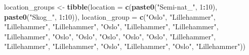\documentclass[]{article}
\newenvironment{Shaded}{\begin{snugshade}}{\end{snugshade}}
\newcommand{\DataTypeTok}[1]{\textcolor[rgb]{0.13,0.29,0.53}{#1}}
\newcommand{\DecValTok}[1]{\textcolor[rgb]{0.00,0.00,0.81}{#1}}
\newcommand{\KeywordTok}[1]{\textcolor[rgb]{0.13,0.29,0.53}{\textbf{#1}}}
\newcommand{\NormalTok}[1]{#1}
\newcommand{\OperatorTok}[1]{\textcolor[rgb]{0.81,0.36,0.00}{\textbf{#1}}}
\newcommand{\StringTok}[1]{\textcolor[rgb]{0.31,0.60,0.02}{#1}}
\begin{document}
\begin{Shaded}
\begin{Highlighting}[]
\NormalTok{location_groups <-}\StringTok{ }\KeywordTok{tibble}\NormalTok{(}\DataTypeTok{location =} \KeywordTok{c}\NormalTok{(}\KeywordTok{paste0}\NormalTok{(}\StringTok{"Semi-nat_"}\NormalTok{, }\DecValTok{1}\OperatorTok{:}\DecValTok{10}\NormalTok{), }\KeywordTok{paste0}\NormalTok{(}\StringTok{"Skog_"}\NormalTok{, }\DecValTok{1}\OperatorTok{:}\DecValTok{10}\NormalTok{)),}
                          \DataTypeTok{location_group =} \KeywordTok{c}\NormalTok{(}\StringTok{"Oslo"}\NormalTok{, }\StringTok{"Lillehammer"}\NormalTok{, }\StringTok{"Lillehammer"}\NormalTok{, }\StringTok{"Lillehammer"}\NormalTok{,}
                                             \StringTok{"Oslo"}\NormalTok{, }\StringTok{"Lillehammer"}\NormalTok{, }\StringTok{"Lillehammer"}\NormalTok{, }\StringTok{"Lillehammer"}\NormalTok{,}
                                             \StringTok{"Oslo"}\NormalTok{, }\StringTok{"Oslo"}\NormalTok{, }\StringTok{"Oslo"}\NormalTok{, }\StringTok{"Oslo"}\NormalTok{, }\StringTok{"Oslo"}\NormalTok{, }\StringTok{"Lillehammer"}\NormalTok{,}
                                             \StringTok{"Lillehammer"}\NormalTok{, }\StringTok{"Lillehammer"}\NormalTok{, }\StringTok{"Oslo"}\NormalTok{, }\StringTok{"Lillehammer"}\NormalTok{,}
                                             \StringTok{"Oslo"}\NormalTok{, }\StringTok{"Lillehammer"}\NormalTok{))}
\end{Highlighting}
\end{Shaded}
\end{document}
